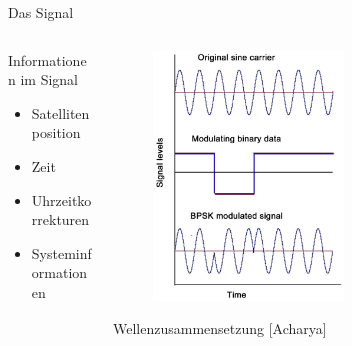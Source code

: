 \begin{frame}{Das Signal}
    \begin{columns}
        \begin{column}{0.5\textwidth}
            Informationen im Signal
            \begin{itemize}
                \item Satellitenposition
                \item Zeit
                \item Uhrzeitkorrekturen
                \item Systeminformationen
                \end{itemize}\pause
        \end{column}
        \begin{column}{0.5\textwidth}
            \begin{figure}
                \centering
                \includegraphics[width=0.6\textwidth]{images/signalzusammensetzung.png}
            \end{figure}
            Wellenzusammensetzung {\small[Acharya]}
        \end{column}
    \end{columns}
\end{frame}
